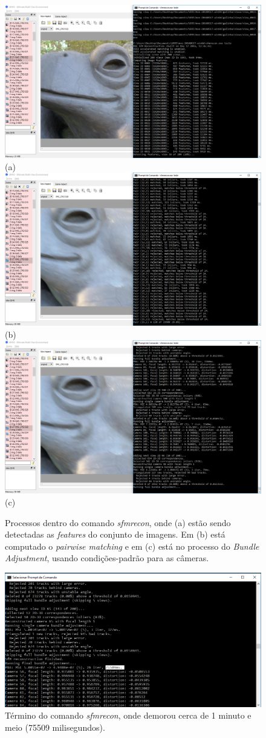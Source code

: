 \begin{figure}[!h]
	\centering
	\includegraphics[width=0.5\linewidth]{figs/umve2sfm.png} (a)
	\includegraphics[width=0.5\linewidth]{figs/umve3sfmfeature.png} (b)
	\includegraphics[width=0.5\linewidth]{figs/umve4ba.png} (c)
	\caption{%
	Processos dentro do comando {\it sfmrecon}, onde (a) estão sendo detectadas as {\it features} do conjunto de imagens. Em (b) está computado o {\it pairwise matching} e em (c) está no processo do {\it Bundle Adjustment}, usando condições-padrão para as câmeras.
	}\label{fig:passosMVE}
\end{figure} 

\begin{figure}[!h]
	\centering
	\includegraphics[width=0.8\linewidth]{figs/sfmmve.png}
	\caption{%
	Término do comando {\it sfmrecon}, onde demorou cerca de 1 minuto e meio (75509 milisegundos).
	}\label{fig:MVESfM}
\end{figure}

